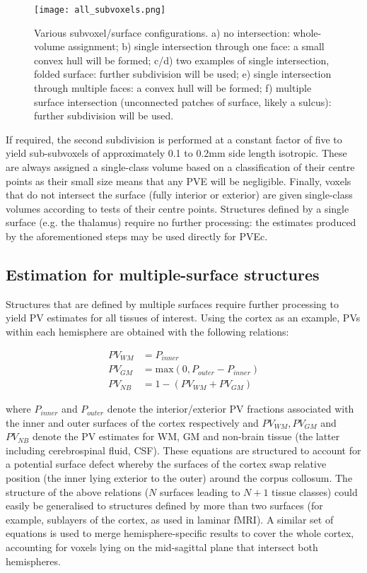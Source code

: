 \begin{figure}
\centering
\texttt{[image: all\_subvoxels.png]}
\caption{Various subvoxel/surface configurations. a) no intersection: whole-volume assignment; b) single intersection through one face: a small convex hull will be formed; c/d) two examples of single intersection, folded surface: further subdivision will be used; e) single intersection through multiple faces: a convex hull will be formed; f) multiple surface intersection (unconnected patches of surface, likely a sulcus): further subdivision will be used. }
\label{all_subvoxels}
\end{figure}

If required, the second subdivision is performed at a constant factor of five to yield sub-subvoxels of approximately 0.1 to 0.2mm side length isotropic. These are always assigned a single-class volume based on a classification of their centre points as their small size means that any PVE will be negligible. Finally, voxels that do not intersect the surface (fully interior or exterior) are given single-class volumes according to tests of their centre points. Structures defined by a single surface (e.g. the thalamus) require no further processing: the estimates produced by the aforementioned steps may be used directly for PVEc.
 
\subsection{Estimation for multiple-surface structures}
Structures that are defined by multiple surfaces require further processing to yield PV estimates for all tissues of interest. Using the cortex as an example, PVs within each hemisphere are obtained with the following relations:

\begin{align}
PV_{WM} &= P_{inner} \\
PV_{GM} &= \mathrm{max}(0, P_{outer} - P_{inner}) \\
PV_{NB} &= 1 - (PV_{WM} + PV_{GM}) 
\end{align}

where $P_{inner}$ and $P_{outer}$ denote the interior/exterior PV fractions associated with the inner and outer surfaces of the cortex respectively and $PV_{WM}, PV_{GM}$ and $PV_{NB}$ denote the PV estimates for WM, GM and non-brain tissue (the latter including cerebrospinal fluid, CSF). These equations are structured to account for a potential surface defect whereby the surfaces of the cortex swap relative position (the inner lying exterior to the outer) around the corpus collosum. The structure of the above relations ($N$ surfaces leading to $N+1$ tissue classes) could easily be generalised to structures defined by more than two surfaces (for example, sublayers of the cortex, as used in laminar fMRI). A similar set of equations is used to merge hemisphere-specific results to cover the whole cortex, accounting for voxels lying on the mid-sagittal plane that intersect both hemispheres.
 
